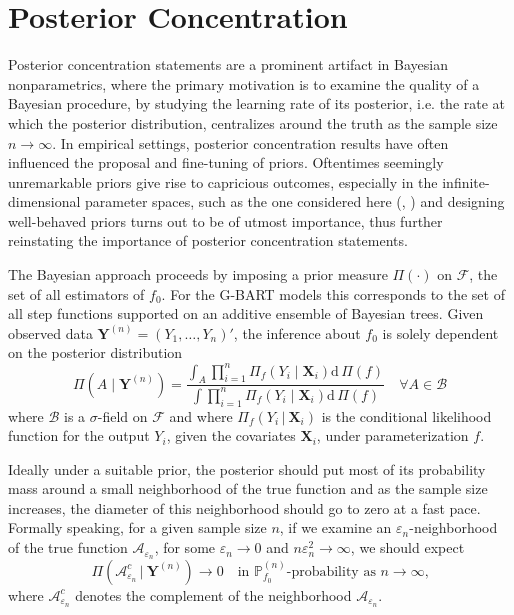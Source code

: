 \documentclass[12pt]{article}
\newcommand{\bm}[1]{\boldsymbol{#1}}
\renewcommand{\d}{\mathrm{d}}
\renewcommand{\P}{\mathbb{P}}
\newcommand{\Y}{\bm{Y}}
\newcommand{\1}{\mathbb{I}}
\def\C {\,|\:}
\def\C {\,|\:}
\def\mF{\mathcal{F}}
\def\Y{\bm{Y}}
\def\X{\bm{X}}
\renewcommand{\d}{\mathrm{d}\,}
\renewcommand{\d}{\mathrm{d}}
\renewcommand{\P}{\mathbb{P}}
\def\C{\mbox{\boldmath$C$}}
\def\d{\mbox{\boldmath$d$}}
\def\X{\mbox{\boldmath$X$}}
\renewcommand{\Y}{\bm{Y}}
\def\C {\,|\:}
\def\C {\,|\:}
\def\X{\bm{X}}
\renewcommand{\d}{\mathrm{d}\,}
\theoremstyle{plain}
\theoremstyle{definition}
\theoremstyle{remark}
\begin{document}
\section{Posterior Concentration}\label{sec:Posterior_concentration}
Posterior concentration statements are a prominent artifact in Bayesian nonparametrics, where the primary motivation is to examine the quality of a Bayesian procedure, by studying the learning rate of its posterior, i.e. the rate at which the posterior distribution, centralizes around the truth as the sample size $n\rightarrow\infty$. In empirical settings, posterior concentration results have often influenced the proposal and fine-tuning of priors. Oftentimes seemingly unremarkable priors give rise to capricious outcomes, especially in the infinite-dimensional parameter spaces, such as the one considered here (\cite{cox1993analysis}, \cite{diaconis1986consistency}) and designing well-behaved priors turns out to be of utmost importance, thus further reinstating the importance of posterior concentration statements.

The Bayesian approach proceeds by imposing a prior measure $\Pi(\cdot)$ on $\mF$, the set of all estimators of $f_0$. For the G-BART models this corresponds to the set of all step functions supported on an additive ensemble of Bayesian trees. Given observed data $\Y^{(n)}=(Y_1,\dots, Y_n)'$, the inference about $f_0$ is solely dependent on the posterior distribution
$$
\Pi(A\mid\Y^{(n)})=\frac{\int_A \prod_{i=1}^n \Pi_f(Y_i\mid\X_i)\d\Pi(f)}{\int \prod_{i=1}^n \Pi_f(Y_i\mid\X_i)\d\Pi(f)}\quad\forall A\in\mathcal{B}
$$
where $\mathcal{B}$ is a $\sigma$-field on $\mF$ and 
where $\Pi_f(Y_i\C\X_i)$ is the conditional likelihood function for the output $Y_i$, given the covariates $\X_i$, under parameterization $f$.

Ideally under a suitable prior, the posterior should put most of its probability mass around a small neighborhood of the true function and as the sample size increases, the diameter of this neighborhood should go to zero at a fast pace. Formally speaking, for a given sample size $n$, if we examine an $\varepsilon_n$-neighborhood of the true function $\mathcal{A}_{\varepsilon_n}$, for some $\varepsilon_n \rightarrow 0$ and $n \varepsilon_n^2 \rightarrow \infty$, we should expect
\begin{equation}\label{eq:exponential_concentration}
\Pi(\mathcal{A}_{\varepsilon_n}^c \C \Y^{(n)} ) \rightarrow 0\quad\text{in $\P_{f_0}^{(n)}$-probability as $n\rightarrow\infty$,} 
\end{equation}
where $\mathcal{A}_{\varepsilon_n}^c$ denotes the complement of the neighborhood $\mathcal{A}_{\varepsilon_n}$.
\end{document}
